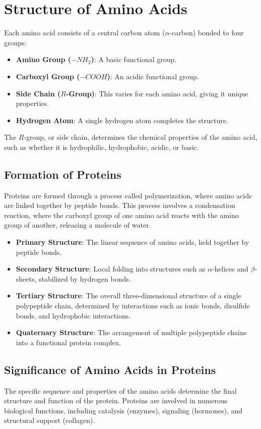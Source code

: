 \documentclass[English, Lau, oneside]{sapthesis}
\begin{document}
\section{Structure of Amino Acids}
Each amino acid consists of a central carbon atom (\(\alpha\)-carbon) bonded to four groups:
\begin{itemize}
    \item \textbf{Amino Group (\(-NH_2\))}: A basic functional group.
    \item \textbf{Carboxyl Group (\(-COOH\))}: An acidic functional group.
    \item \textbf{Side Chain (\(R\)-Group)}: This varies for each amino acid, giving it unique properties.
    \item \textbf{Hydrogen Atom}: A single hydrogen atom completes the structure.
\end{itemize}

The \(R\)-group, or side chain, determines the chemical properties of the amino acid, such as whether it is hydrophilic, hydrophobic, acidic, or basic.

\subsection{Formation of Proteins}
Proteins are formed through a process called polymerization, where amino acids are linked together by peptide bonds. This process involves a condensation reaction, where the carboxyl group of one amino acid reacts with the amino group of another, releasing a molecule of water.

\begin{itemize}
    \item \textbf{Primary Structure}: The linear sequence of amino acids, held together by peptide bonds.
    \item \textbf{Secondary Structure}: Local folding into structures such as \(\alpha\)-helices and \(\beta\)-sheets, stabilized by hydrogen bonds.
    \item \textbf{Tertiary Structure}: The overall three-dimensional structure of a single polypeptide chain, determined by interactions such as ionic bonds, disulfide bonds, and hydrophobic interactions.
    \item \textbf{Quaternary Structure}: The arrangement of multiple polypeptide chains into a functional protein complex.
\end{itemize}

\subsection{Significance of Amino Acids in Proteins}
The specific sequence and properties of the amino acids determine the final structure and function of the protein. Proteins are involved in numerous biological functions, including catalysis (enzymes), signaling (hormones), and structural support (collagen).
\end{document}
